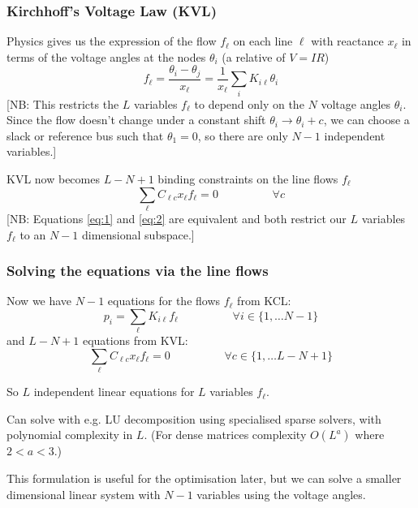 \documentclass[10pt,aspectratio=169,dvipsnames]{beamer}
\begin{document}
\begin{frame}
  \frametitle{Kirchhoff's Voltage Law (KVL)}

  Physics gives us the expression of the flow $f_\ell$ on each line $\ell$ with reactance $x_\ell$ in terms of the voltage angles at the nodes $\theta_i$  (a
  relative of $V = IR$)
  \begin{equation}
    f_\ell = \frac{\theta_i - \theta_j}{x_\ell} = \frac{1}{x_\ell}\sum_{i} K_{i\ell} \theta_i \label{eq:1}
  \end{equation}
      [NB: This restricts the $L$ variables $f_\ell$ to depend only on the $N$ voltage angles $\theta_i$. Since the flow doesn't change under a constant shift $\theta_i \to \theta_i + c$, we can choose   a \alert{slack} or \alert{reference bus} such that  $\theta_1 = 0$, so there are only $N-1$ independent variables.]

      \vspace{.5cm}


  KVL now becomes $L-N+1$ binding constraints on the line flows $f_\ell$
  \begin{equation}
    \sum_\ell C_{\ell c} x_\ell f_\ell = 0 \hspace{2cm} \forall c  \label{eq:2}
  \end{equation}
  [NB: Equations \eqref{eq:1} and  \eqref{eq:2} are equivalent and both restrict our $L$ variables $f_\ell$ to an $N-1$ dimensional subspace.]

\end{frame}

\begin{frame}
  \frametitle{Solving the equations via the line flows}

  Now we have $N-1$ equations for the flows $f_\ell$ from KCL:
  \begin{equation*}
    p_i = \sum_\ell K_{i\ell} f_\ell \hspace{2cm}\forall i \in \{ 1, \dots N-1 \}
  \end{equation*}
  and $L-N+1$ equations from KVL:
  \begin{equation*}
    \sum_\ell C_{\ell c} x_\ell f_\ell = 0 \hspace{2cm}\forall c \in \{ 1, \dots L-N+1 \}
  \end{equation*}

  So $L$ independent linear equations for $L$ variables $f_\ell$.

  Can solve with e.g. LU decomposition using specialised sparse solvers, with polynomial complexity in $L$. (For dense matrices complexity $O(L^a)$ where $2 < a < 3$.)

  This formulation is useful for the optimisation later, but we can solve a smaller dimensional linear system with $N-1$ variables using the voltage angles.
\end{frame}
\end{document}
